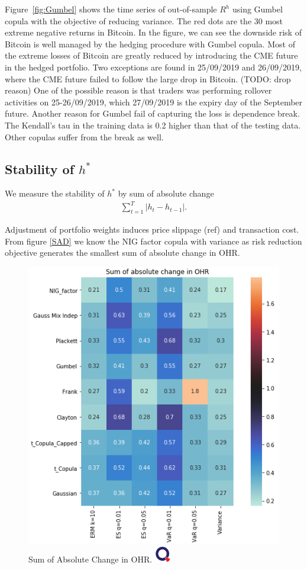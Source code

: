 Figure~\ref{fig:Gumbel} shows the time series of out-of-sample $R^h$ using Gumbel copula with the
objective of reducing variance.
The red dots are the 30 most extreme negative returns in Bitcoin.
In the figure, we can see the downside risk of Bitcoin is well managed by the hedging procedure with Gumbel copula.
Most of the extreme losses of Bitcoin are greatly reduced by introducing the CME future in the hedged portfolio.
Two exceptions are found in 25/09/2019 and 26/09/2019, where the CME future failed to follow the large drop in Bitcoin. (TODO: drop reason)
One of the possible reason is that traders was performing rollover activities on 25-26/09/2019, which
27/09/2019 is the expiry day of the September future.
Another reason for Gumbel fail of capturing the loss is dependence break.
The Kendall's tau in the training data is 0.2 higher than that of the testing data.
Other copulas suffer from the break as well.



\subsection{Stability of $h^*$}
We measure the stability of $h^*$ by sum of absolute change
\begin{align}
    \sum_{t=1}^T|h_t - h_{t-1}|.
    \end{align}

Adjustment of portfolio weights induces price slippage (ref) and transaction cost.
From figure \ref{SAD} we know the NIG factor copula with variance as risk reduction objective generates the smallest
sum of absolute change in OHR.

\begin{figure}[!th]
   \centering
   \includegraphics[width=\textwidth]{_pics/Sum of absolute change in OHR.png}
   \caption{Sum of Absolute Change in OHR.
   \href{http://www.quantlet.com/}{\includegraphics[width=20pt]{_pics/qletlogo_tr.png}}}
   \label{fig:SAD}
\end{figure}

%